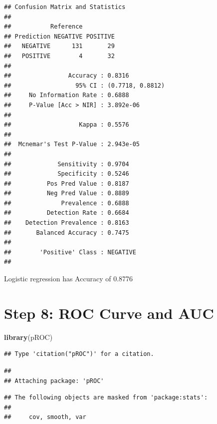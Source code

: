 \documentclass[
]{article}
\newenvironment{Shaded}{\begin{snugshade}}{\end{snugshade}}
\newcommand{\FunctionTok}[1]{\textcolor[rgb]{0.13,0.29,0.53}{\textbf{#1}}}
\newcommand{\NormalTok}[1]{#1}
\newcommand{\OtherTok}[1]{\textcolor[rgb]{0.56,0.35,0.01}{#1}}
\newcommand{\SpecialCharTok}[1]{\textcolor[rgb]{0.81,0.36,0.00}{\textbf{#1}}}
\begin{document}
\begin{verbatim}
## Confusion Matrix and Statistics
## 
##           Reference
## Prediction NEGATIVE POSITIVE
##   NEGATIVE      131       29
##   POSITIVE        4       32
##                                           
##                Accuracy : 0.8316          
##                  95% CI : (0.7718, 0.8812)
##     No Information Rate : 0.6888          
##     P-Value [Acc > NIR] : 3.892e-06       
##                                           
##                   Kappa : 0.5576          
##                                           
##  Mcnemar's Test P-Value : 2.943e-05       
##                                           
##             Sensitivity : 0.9704          
##             Specificity : 0.5246          
##          Pos Pred Value : 0.8187          
##          Neg Pred Value : 0.8889          
##              Prevalence : 0.6888          
##          Detection Rate : 0.6684          
##    Detection Prevalence : 0.8163          
##       Balanced Accuracy : 0.7475          
##                                           
##        'Positive' Class : NEGATIVE        
## 
\end{verbatim}

Logistic regression has Accuracy of 0.8776

\section{Step 8: ROC Curve and AUC}\label{step-8-roc-curve-and-auc}

\begin{Shaded}
\begin{Highlighting}[]
\FunctionTok{library}\NormalTok{(pROC)}
\end{Highlighting}
\end{Shaded}

\begin{verbatim}
## Type 'citation("pROC")' for a citation.
\end{verbatim}

\begin{verbatim}
## 
## Attaching package: 'pROC'
\end{verbatim}

\begin{verbatim}
## The following objects are masked from 'package:stats':
## 
##     cov, smooth, var
\end{verbatim}

\begin{Shaded}
\end{Shaded}
\end{document}
